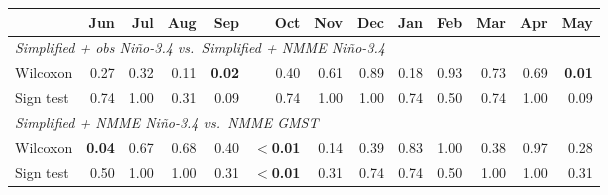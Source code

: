 \begin{tabular}{l*{12}{r}}
\hline
 & Jun & Jul & Aug & Sep & Oct & Nov & Dec & Jan & Feb & Mar & Apr & May \\
\hline
\multicolumn{13}{l}{\emph{Simplified + obs Ni\~{n}o-3.4 vs.\ Simplified + NMME Ni\~{n}o-3.4}} \\
\quad Wilcoxon & 0.27 & 0.32 & 0.11 & \textbf{0.02} & 0.40 & 0.61 & 0.89 & 0.18 & 0.93 & 0.73 & 0.69 & \textbf{0.01} \\
\quad Sign test & 0.74 & 1.00 & 0.31 & 0.09 & 0.74 & 1.00 & 1.00 & 0.74 & 0.50 & 0.74 & 1.00 & 0.09 \\
\multicolumn{13}{l}{\emph{Simplified + NMME Ni\~{n}o-3.4 vs.\ NMME GMST}} \\
\quad Wilcoxon & \textbf{0.04} & 0.67 & 0.68 & 0.40 & \textbf{$<$0.01} & 0.14 & 0.39 & 0.83 & 1.00 & 0.38 & 0.97 & 0.28 \\
\quad Sign test & 0.50 & 1.00 & 1.00 & 0.31 & \textbf{$<$0.01} & 0.31 & 0.74 & 0.74 & 0.50 & 1.00 & 1.00 & 0.31 \\
\hline
\end{tabular}
